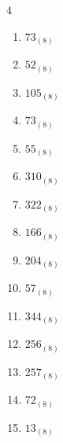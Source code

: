 \begin{multicols}{4}
\begin{enumerate}
        \phantom{$=41$}

  \item $73_{(8)}$

        \phantom{$=59$}

  \item $52_{(8)}$

        \phantom{$=42$}

  \item $105_{(8)}$

        \phantom{$=69$}

  \item $73_{(8)}$

        \phantom{$=59$}

  \item $55_{(8)}$

        \phantom{$=45$}

  \item $310_{(8)}$

        \phantom{$=200$}

  \item $322_{(8)}$

        \phantom{$=210$}

  \item $166_{(8)}$

        \phantom{$=118$}

\columnbreak %

\resetques

  \item $204_{(8)}$

        \phantom{$=132$}

  \item $57_{(8)}$

        \phantom{$=47$}

  \item $344_{(8)}$

        \phantom{$=228$}

  \item $256_{(8)}$

        \phantom{$=174$}

  \item $257_{(8)}$

        \phantom{$=175$}

  \item $72_{(8)}$

        \phantom{$=58$}

  \item $13_{(8)}$


\end{enumerate}
\end{multicols}
